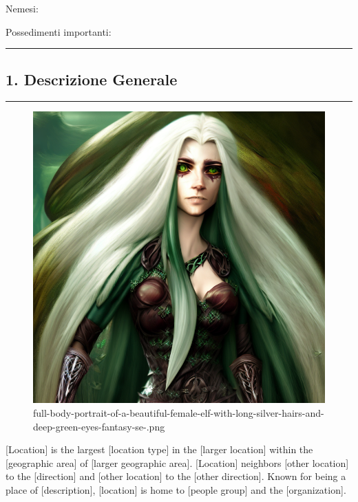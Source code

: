 Nemesi:

Possedimenti importanti:

\begin{center}\rule{0.5\linewidth}{0.5pt}\end{center}

\subsection{1. Descrizione Generale}\label{descrizione-generale}

\begin{center}\rule{0.5\linewidth}{0.5pt}\end{center}

\begin{figure}
\centering
\includegraphics{full-body-portrait-of-a-beautiful-female-elf-with-long-silver-hairs-and-deep-green-eyes-fantasy-se-.png}
\caption{full-body-portrait-of-a-beautiful-female-elf-with-long-silver-hairs-and-deep-green-eyes-fantasy-se-.png}
\end{figure}

{[}Location{]} is the largest {[}location type{]} in the {[}larger
location{]} within the {[}geographic area{]} of {[}larger geographic
area{]}. {[}Location{]} neighbors {[}other location{]} to the
{[}direction{]} and {[}other location{]} to the {[}other direction{]}.
Known for being a place of {[}description{]}, {[}location{]} is home to
{[}people group{]} and the {[}organization{]}.


